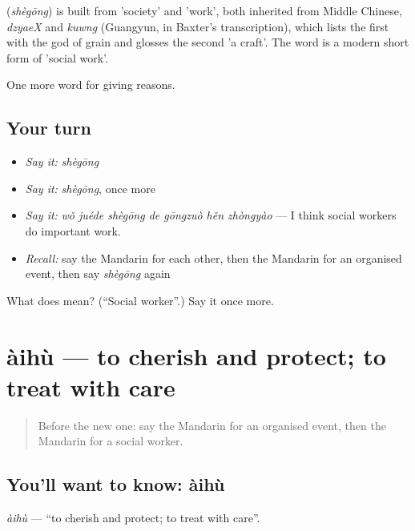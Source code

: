 \begin{cousinweb}
\textbf{} (\emph{shègōng}) is built from  'society' and  'work', both inherited from Middle Chinese, \emph{dzyaeX} and \emph{kuwng} (Guangyun, in Baxter's transcription), which lists the first with the god of grain and glosses the second 'a craft'. The word is a modern short form of 'social work'.
\end{cousinweb}

\begin{grammarlens}[title={What you've built}]
One more word for giving reasons.
\end{grammarlens}

\subsection*{Your turn}
\begin{itemize}
\raggedright
  \item \emph{Say it:} \emph{shègōng}
  \item \emph{Say it:} \emph{shègōng}, once more
  \item \emph{Say it:} \emph{wǒ juéde shègōng de gōngzuò hěn zhòngyào} — I think social workers do important work.
  \item \emph{Recall:} say the Mandarin for each other, then the Mandarin for an organised event, then say \emph{shègōng} again
\end{itemize}

\begin{tcolorbox}[breakable,colback=teal!4,colframe=teal!35!black,title={Before you move on}]
What does  mean? (\textquotedblleft{}Social worker\textquotedblright{}.) Say it once more.
\end{tcolorbox}
\section[àihù]{àihù — to cherish and protect; to treat with care}

\label{lesson:ZH-C376-aihu}



\begin{quote}
Before the new one: say the Mandarin for an organised event, then the Mandarin for a social worker.
\end{quote}

\subsection*{You'll want to know: àihù}
\emph{àihù} — \textquotedblleft{}to cherish and protect; to treat with care\textquotedblright{}.

